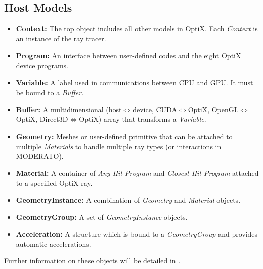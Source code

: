 \subsection{Host Models}
\begin{itemize}
  \item \textbf{Context:} The top object includes all other models in OptiX. Each \textit{Context} is an instance of the ray tracer.
  \item \textbf{Program:} An interface between user-defined codes and the eight OptiX device programs.
  \item \textbf{Variable:} A label used in communications between CPU and GPU. It must be bound to a \textit{Buffer}.
  \item \textbf{Buffer:} A multidimensional (host$\Leftrightarrow$device, CUDA$\Leftrightarrow$OptiX, OpenGL$\Leftrightarrow$OptiX, Direct3D$\Leftrightarrow$OptiX) array that transforms a \textit{Variable}.
  \item \textbf{Geometry:} Meshes or user-defined primitive that can be attached to multiple \textit{Materials} to handle multiple ray types (or interactions in MODERATO).
  \item \textbf{Material:} A container of \textit{Any Hit Program} and \textit{Closest Hit Program} attached to a specified OptiX ray.
  \item \textbf{GeometryInstance:} A combination of \textit{Geometry} and \textit{Material} objects.
  \item \textbf{GeometryGroup:} A set of \textit{GeometryInstance} objects.
  \item \textbf{Acceleration:} A structure which is bound to a \textit{GeometryGroup} and provides automatic accelerations.
\end{itemize}
Further information on these objects will be detailed in .

